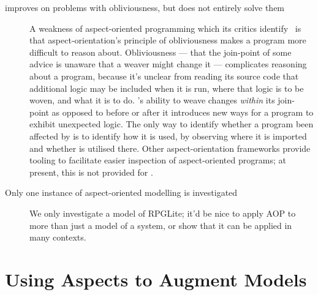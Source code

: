 \begin{description}

  \item[\pdsf{} improves on problems with obliviousness, but does not entirely
    solve them]
    A weakness of aspect-oriented
    programming which its critics
    identify~\cite{steimann06paradoxical,Constantinides04aopconsidered,przybylek2010wrong}
    is that aspect-orientation's principle of obliviousness makes a program more
    difficult to reason about. Obliviousness --- that the join-point of some
    advice is unaware that a weaver might change it --- complicates reasoning
    about a program, because it's unclear from reading its source code that
    additional logic may be included when it is run, where that logic is to be
    woven, and what it is to do. \pdsf{}'s ability to weave changes
    \emph{within} its join-point as opposed to before or after it introduces new
    ways for a program to exhibit unexpected logic. The only way to identify
    whether a program been affected by \pdsf{} is to identify how it is used, by
    observing where it is imported and whether \pdsf{} is utilised there. Other
    aspect-orientation frameworks provide tooling to facilitate easier
    inspection of aspect-oriented programs; at present, this is not provided for
    \pdsf{}.
  \item[Only one instance of aspect-oriented modelling is investigated]
     We only investigate a model of RPGLite;
    it'd be nice to apply AOP to more than just a model of a \sociotechnical
    system, or show that it can be applied in many contexts.

\end{description}





\section{Using Aspects to Augment Models}



